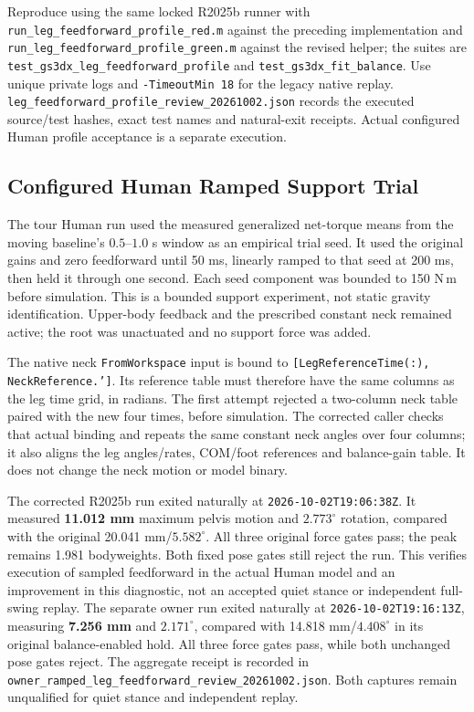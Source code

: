 \documentclass[11pt,a4paper]{article}
\begin{document}
Reproduce using the same locked R2025b runner with
\texttt{run\_leg\_feedforward\_profile\_red.m} against the preceding
implementation and \texttt{run\_leg\_feedforward\_profile\_green.m}
against the revised helper; the suites are
\texttt{test\_gs3dx\_leg\_feedforward\_profile} and
\texttt{test\_gs3dx\_fit\_balance}. Use unique private logs and
\texttt{-TimeoutMin 18} for the legacy native replay.
\texttt{leg\_feedforward\_profile\_review\_20261002.json} records the
executed source/test hashes, exact test names and natural-exit receipts.
Actual configured Human profile acceptance is a separate execution.


\subsection{Configured Human Ramped Support Trial}
The tour Human run used the measured generalized net-torque means from
the moving baseline's $0.5$--$1.0$ s window as an empirical trial seed.
It used the original gains and zero feedforward until 50 ms, linearly
ramped to that seed at 200 ms, then held it through one second. Each
seed component was bounded to 150 N\,m before simulation. This is a
bounded support experiment, not static gravity identification. Upper-body
feedback and the prescribed constant neck remained active; the root was
unactuated and no support force was added.

The native neck \texttt{FromWorkspace} input is bound to
\texttt{[LegReferenceTime(:), NeckReference.']}. Its reference table must
therefore have the same columns as the leg time grid, in radians. The
first attempt rejected a two-column neck table paired with the new four
times, before simulation. The corrected caller checks that actual binding
and repeats the same constant neck angles over four columns; it also
aligns the leg angles/rates, COM/foot references and balance-gain table.
It does not change the neck motion or model binary.

The corrected R2025b run exited naturally at
\texttt{2026-10-02T19:06:38Z}. It measured \textbf{11.012 mm} maximum
pelvis motion and \textbf{$2.773^\circ$} rotation, compared with the
original 20.041 mm/$5.582^\circ$. All three original force gates pass;
the peak remains 1.981 bodyweights. Both fixed pose gates still reject
the run. This verifies execution of sampled feedforward in the actual
Human model and an improvement in this diagnostic, not an accepted
quiet stance or independent full-swing replay. The separate owner run exited naturally at
\texttt{2026-10-02T19:16:13Z}, measuring \textbf{7.256 mm} and
\textbf{$2.171^\circ$}, compared with 14.818 mm/$4.408^\circ$ in its
original balance-enabled hold. All three force gates pass, while both
unchanged pose gates reject. The aggregate receipt is recorded in
\texttt{owner\_ramped\_leg\_feedforward\_review\_20261002.json}.
Both captures remain unqualified for quiet stance and independent replay.
\end{document}
